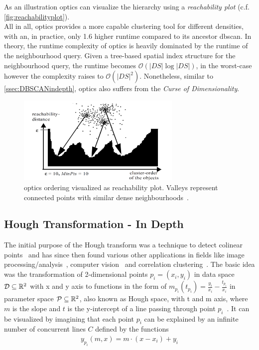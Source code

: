 As an illustration \gls{optics} can visualize the hierarchy using a \textit{reachability plot} (c.f. \autoref{fig:reachabilityplot}).\\

All in all, \gls{optics} provides a more capable clustering tool for different densities, with an, in practice, only 1.6 higher runtime compared to its ancestor \gls{dbscan}. In theory, the runtime complexity of \gls{optics} is heavily dominated by the runtime of the neighbourhood query. Given a tree-based spatial index structure for the neighbourhood query, the runtime becomes $\mathcal{O}(|DS| \log |DS|)$, in the worst-case however the complexity raises to $\mathcal{O}(|DS|^2)$. Nonetheless, similar to \autoref{ssec:DBSCANindepth}, \gls{optics} also suffers from the \textit{Curse of Dimensionality}.

\begin{figure}
    \centering
    \includegraphics[width=0.7\textwidth]{figures/reachabilityplot.png}
    \caption{\acrshort{optics} ordering visualized as reachability plot. Valleys represent connected points with similar dense neighbourhoods~\cite{opticsankerst1999optics}.}
    \label{fig:reachabilityplot}
\end{figure}

\subsection{Hough Transformation - In Depth}\label{ssec:houghindepth}
The initial purpose of the Hough transform was a technique to detect colinear points~\cite{houghOriginal1962method} and has since then found various other applications in fields like image processing/analysis~\cite{rosenfeld1969picture,ballard1981generalizing}, computer vision~\cite{davies2004machine} and correlation clustering~\cite{CASHachtert2008robust}.
The basic idea was the transformation of 2-dimensional points $p_i = (x_i,y_i)$ in data space $\mathcal{D} \subseteq \mathbb{R}^2$ with x and y axis to functions in the form of ${m_{p_i}(t_{p_i}) = \frac{y_i}{x_i} - \frac{t_{p_i}}{x_i}}$ in parameter space $\mathcal{P} \subseteq \mathbb{R}^2$, also known as Hough space, with t and m axis, where $m$ is the slope and $t$ is the y-intercept of a line passing through point $p_i$~\cite{illingworth1988survey}. It can be visualized by imagining that each point $p_i$ can be explained by an infinite number of concurrent lines $C$ defined by the functions 
\begin{align}
    {y_{p_i}(m,x) = m \cdot (x - x_i) + y_i}
\end{align}

